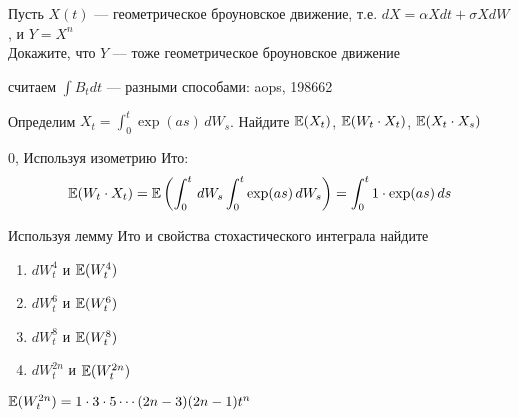 \begin{problem}
Пусть $X(t)$ — геометрическое броуновское движение, т.е. $dX=\alpha Xdt+\sigma XdW$, и $Y=X^{n}$ \\
Докажите, что $Y$ — тоже геометрическое броуновское движение

\begin{sol}

\end{sol}
\end{problem}

\begin{problem}
считаем $\int B_{t}dt$ — разными способами: aops, 198662

\begin{sol}

\end{sol}
\end{problem}

\begin{problem}
 Определим $X_t=\int_0^t \exp(as)\,dW_s$. Найдите $\mathbb{E}(X_t)$, $\mathbb{E}(W_t\cdot X_t)$, $\mathbb{E}(X_t\cdot X_s)$

\begin{sol}
 $0$, Используя изометрию Ито:
\begin{equation}
\mathbb{E}(W_t\cdot X_t)=\mathbb{E}\left(\int_0^t\,dW_s \int_0^t\exp(as)\,dW_s\right)=\int_0^t 1\cdot \exp(as)\,ds
\end{equation}
\end{sol}
\end{problem}

\begin{problem}
Используя лемму Ито и свойства стохастического интеграла найдите
\begin{enumerate}
\item $dW^4_t$ и $\mathbb{E}(W^4_t)$
\item $dW^6_t$ и $\mathbb{E}(W^6_t)$
\item $dW^8_t$ и $\mathbb{E}(W^8_t)$
\item $dW^{2n}_t$ и $\mathbb{E}(W^{2n}_t)$
\end{enumerate}

\begin{sol}
 $\mathbb{E}(W^{2n}_t)=1\cdot 3\cdot 5 \cdots (2n-3)(2n-1)t^n$
\end{sol}
\end{problem}

